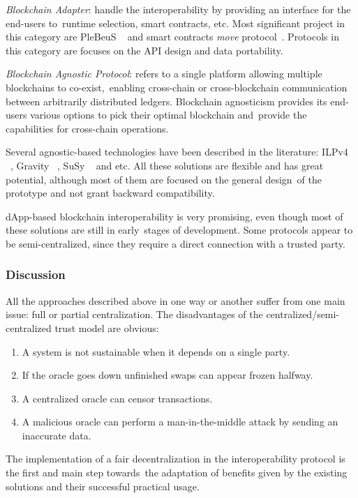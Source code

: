 \emph{Blockchain Adapter}: handle the interoperability by providing an interface for the end-users to\
runtime selection, smart contracts, etc.
Most significant project in this category are PleBeuS ~\cite{Scheid2020} and smart contracts \emph{move} protocol\
\cite{Fynn2020}.
Protocols in this category are focuses on the API design and data portability.

\emph{Blockchain Agnostic Protocol}: refers to a single platform allowing multiple blockchains to co-exist,\
enabling cross-chain or cross-blockchain communication between arbitrarily distributed ledgers.
Blockchain agnosticism provides its end-users various options to pick their optimal blockchain and\
provide the capabilities for cross-chain operations.

Several agnostic-based technologies have been described in the literature: ILPv4 ~\cite{InterledgerV4},
Gravity ~\cite{PupyshevGravity2020}, SuSy ~\cite{PupyshevSuSy2020} and etc.
All these solutions are flexible and has great potential, although most of them are focused on the general design\
of the prototype and not grant backward compatibility.


dApp-based blockchain interoperability is very promising, even though most of these solutions are still in early\
stages of development.
Some protocols appear to be semi-centralized, since they require a direct connection with a trusted party.

\subsubsection{Discussion}

All the approaches described above in one way or another suffer from one main issue: full or partial centralization.
The disadvantages of the centralized/semi-centralized trust model are obvious:
\begin{enumerate}
    \item A system is not sustainable when it depends on a single party.
    \item If the oracle goes down unfinished swaps can appear frozen halfway.
    \item A centralized oracle can censor transactions.
    \item A malicious oracle can perform a man-in-the-middle attack by sending an inaccurate data.
\end{enumerate}

The implementation of a fair decentralization in the interoperability protocol is the first and main step towards\
the adaptation of benefits given by the existing solutions and their successful practical usage.